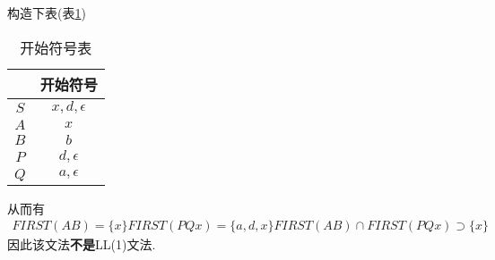 \documentclass[UTF8]{article}
\begin{document}
\noindent 构造下表(表\ref{3.12.start})\\
\begin{table}[H]
\centering
\begin{tabular}{|c|c|}
\hline
 & 开始符号 \\
\hline
$S$ & $x,d,\epsilon$ \\
\hline
$A$ & $x$ \\
\hline
$B$ & $b$ \\
\hline
$P$ & $d,\epsilon$ \\
\hline
$Q$ & $a,\epsilon$ \\
\hline
\end{tabular}
\caption{开始符号表}
\label{3.12.start}
\end{table}
\noindent 从而有
$$\begin{array}{l}
FIRST(AB)=\{x\}
FIRST(PQx)=\{a,d,x\}
FIRST(AB)\cap FIRST(PQx)\supset\{x\}
\end{array}$$
因此该文法\textbf{不是}LL(1)文法.
\end{document}

